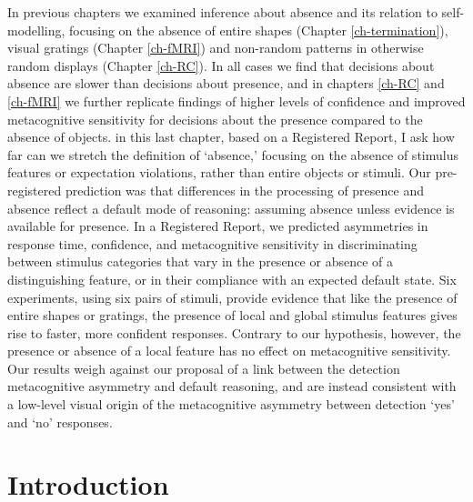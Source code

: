 \documentclass[12pt,twoside]{reedthesis}
\begin{document}
In previous chapters we examined inference about absence and its relation to self-modelling, focusing on the absence of entire shapes (Chapter \ref{ch-termination}), visual gratings (Chapter \ref{ch-fMRI}) and non-random patterns in otherwise random displays (Chapter \ref{ch-RC}). In all cases we find that decisions about absence are slower than decisions about presence, and in chapters \ref{ch-RC} and \ref{ch-fMRI} we further replicate findings of higher levels of confidence and improved metacognitive sensitivity for decisions about the presence compared to the absence of objects. in this last chapter, based on a Registered Report, I ask how far can we stretch the definition of `absence,' focusing on the absence of stimulus features or expectation violations, rather than entire objects or stimuli. Our pre-registered prediction was that differences in the processing of presence and absence reflect a default mode of reasoning: assuming absence unless evidence is available for presence. In a Registered Report, we predicted asymmetries in response time, confidence, and metacognitive sensitivity in discriminating between stimulus categories that vary in the presence or absence of a distinguishing feature, or in their compliance with an expected default state. Six experiments, using six pairs of stimuli, provide evidence that like the presence of entire shapes or gratings, the presence of local and global stimulus features gives rise to faster, more confident responses. Contrary to our hypothesis, however, the presence or absence of a local feature has no effect on metacognitive sensitivity. Our results weigh against our proposal of a link between the detection metacognitive asymmetry and default reasoning, and are instead consistent with a low-level visual origin of the metacognitive asymmetry between detection `yes' and `no' responses.

\hypertarget{introduction-5}{%
\section{Introduction}\label{introduction-5}}
\end{document}
